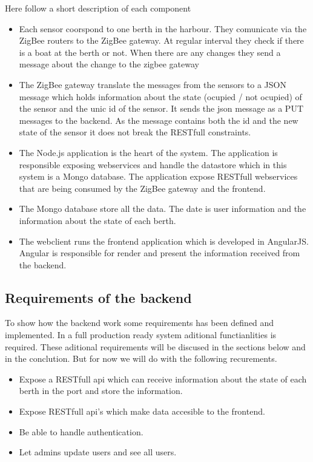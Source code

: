 \documentclass[a4paper,12pt,english]{article}
\begin{document}
Here follow a short description of each component
\begin{itemize}
  \item Each sensor coorspond to one berth in the harbour. They comunicate via
  the ZigBee routers to the ZigBee gateway. At regular interval they check if
  there is a boat at the berth or not. When there are any changes they send a
  message about the change to the zigbee gateway
  \item The ZigBee gateway translate the messages from the sensors to a JSON
  message which holds information about the state (ocupied / not ocupied) of the
  sensor and the unic id of the sensor. It sends the json message as a PUT
  messages to the backend. As the message contains both the id and the new state
  of the sensor it does not break the RESTfull constraints.
  \item The Node.js application is the heart of the system. The application is
  responsible exposing webservices and handle the datastore which in this
  system is a Mongo database. The application expose RESTfull webservices that
  are being consumed by the ZigBee gateway and the frontend.
  \item The Mongo database store all the data. The date is user information and
  the information about the state of each berth.
  \item The webclient runs the frontend application which is developed in
  AngularJS. Angular is responsible for render and present the information
  received from the backend.
\end{itemize} 


\subsection{Requirements of the backend}
To show how the backend work some requirements has been defined and implemented.
In a full production ready system aditional functianlities is required. These
aditional requirements will be discused in the sections below and in the
conclution. But for now we will do with the following recurements.

\begin{itemize}
	\item Expose a RESTfull api which can receive information about the state of
	each berth in the port and store the information.
	\item Expose RESTfull api's which make data accesible to the frontend.
	\item Be able to handle authentication.
	\item Let admins update users and see all users.
\end{itemize}
\end{document}
